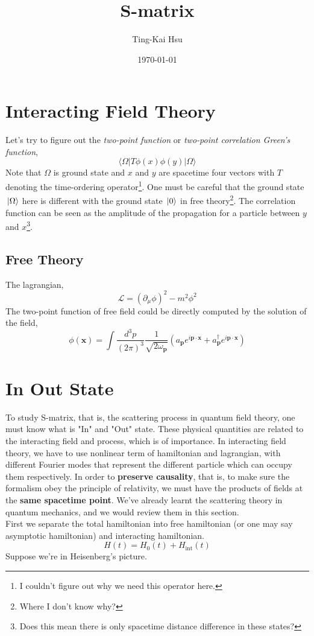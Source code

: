 \documentclass[12pt]{article}
\title{S-matrix}
\author{Ting-Kai Hsu}
\date{\today}
\numberwithin{equation}{section}
\begin{document}
\maketitle
\tableofcontents
\section{Interacting Field Theory}
Let's try to figure out the \textit{two-point function} or \textit{two-point correlation Green's function},
\begin{equation}
    \langle\Omega|T\phi(x)\phi(y)|\Omega\rangle
\end{equation}
Note that $\Omega$ is ground state and $x$ and $y$ are spacetime four vectors with $T$ denoting the time-ordering operator\footnote{I couldn't figure out why we need this operator here.}.
One must be careful that the ground state $\ket*{\Omega}$ here is different with the ground state $\ket*{0}$ in free theory\footnote{Where I don't know why?}.
The correlation function can be seen as the amplitude of the propagation for a particle between $y$ and $x$\footnote{Does this mean there is only spacetime distance difference in these states?}.
\subsection{Free Theory}
The lagrangian,
\begin{equation}
    \mathcal{L} = (\partial_{\mu}\phi)^2 - m^{2}\phi^2
\end{equation}
The two-point function of free field could be directly computed by the solution of the field,
\begin{equation}
    \phi(\mathbf{x}) = \int{\frac{d^3p}{(2\pi)^3}\frac{1}{\sqrt{2\omega_{\mathbf{p}}}}\left(a_{\mathbf{p}}e^{i\mathbf{p}\cdot\mathbf{x}} + a^{\dagger}_{\mathbf{p}}e^{i\mathbf{p}\cdot\mathbf{x}}\right)}
\end{equation}
\section{In Out State}
To study S-matrix, that is, the scattering process in quantum field theory, one must know what is "In" and "Out" state.
These physical quantities are related to the interacting field and process, which is of importance.
In interacting field theory, we have to use nonlinear term of hamiltonian and lagrangian, with different Fourier modes that represent the different particle which can occupy them respectively.
In order to \textbf{preserve causality}, that is, to make sure the formalism obey the principle of relativity, we must have the products of fields at the \textbf{same spacetime point}.
We've already learnt the scattering theory in quantum mechanics, and we would review them in this section.
\\\indent First we separate the total hamiltonian into free hamiltonian (or one may say asymptotic hamiltonian) and interacting hamiltonian.
\begin{equation}
    H(t) = H_{0}(t) + H_{\text{int}}(t)
\end{equation}
Suppose we're in Heisenberg's picture.
\end{document}

